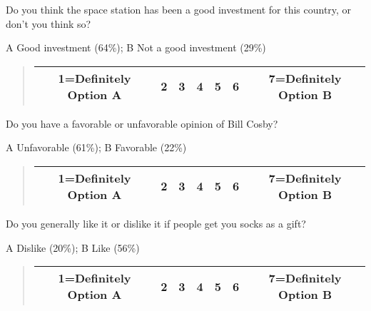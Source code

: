 \documentclass[11pt]{article}
\begin{document}
\begin{tcolorbox}
Do you think the space station has been a good investment for this country, or don’t you think so? \\
\begin{center}
 A Good investment (64\%);  B Not a good investment (29\%)
\end{center}

\begin{quote}
\begin{center}
	\begin{tabular}{|c|c|c|c|c|c|c|}
\hline
		1=Definitely Option A & 2 & 3 & 4 & 5 & 6 & 7=Definitely Option B \\ \hline
\end{tabular}
\end{center}
\end{quote}
\end{tcolorbox}
\begin{tcolorbox}

Do you have a favorable or unfavorable opinion of Bill Cosby?     \\
\begin{center}
A  Unfavorable (61\%); B Favorable (22\%)
\end{center}

\begin{quote}
\begin{center}
	\begin{tabular}{|c|c|c|c|c|c|c|}
\hline
		1=Definitely Option A & 2 & 3 & 4 & 5 & 6 & 7=Definitely Option B \\ \hline
\end{tabular}
\end{center}
\end{quote}
\end{tcolorbox}
\begin{tcolorbox}

Do you generally like it or dislike it if people get you socks as a gift?     \\
\begin{center}
A Dislike (20\%); B Like (56\%)
\end{center}

\begin{quote}
\begin{center}
	\begin{tabular}{|c|c|c|c|c|c|c|}
\hline
		1=Definitely Option A & 2 & 3 & 4 & 5 & 6 & 7=Definitely Option B \\ \hline
\end{tabular}
\end{center}
\end{quote}
\end{tcolorbox}
\end{document}
